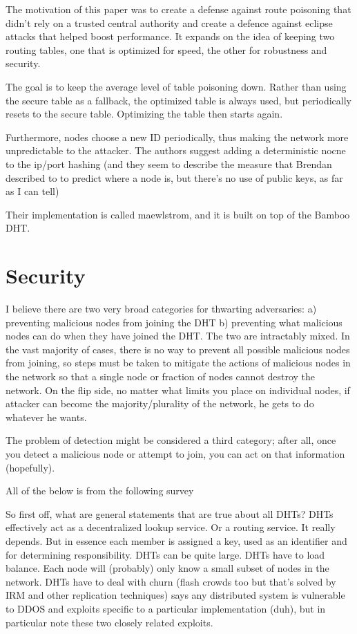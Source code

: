 \documentclass[10pt,letterpaper]{report}
\begin{document}
The motivation of this paper was to create a  defense against route poisoning that didn't rely on a trusted central authority and create a defence against eclipse attacks that helped boost performance.  It expands on the idea of keeping two routing tables, one that is optimized for speed, the other for robustness and security.

The goal is to keep the average level of table poisoning down.  Rather than using the secure table as a fallback, the optimized table is always used, but periodically resets to the secure table.  Optimizing the table then starts again.

Furthermore, nodes choose a new ID periodically, thus making the network more unpredictable to the attacker.   The authors suggest adding a deterministic nocne to the ip/port hashing (and they seem to describe the measure that Brendan described to to predict where a node is, but there's no use of public keys, as far as I can tell)

Their implementation is called maewlstrom, and it is built on top of the Bamboo DHT.


\section{Security}

I believe there are two very broad categories for thwarting adversaries:  a)  preventing malicious nodes from joining the DHT b) preventing what malicious nodes can do when they have joined the DHT.  The two are intractably mixed.  In the vast majority of cases, there is no way to prevent all possible malicious nodes from joining, so steps must be taken to mitigate the actions of malicious nodes in the network so that a single node or fraction of nodes cannot destroy the network.  On the flip side, no matter what limits you place on individual nodes, if attacker can become the majority/plurality of the network, he gets to do whatever he wants.

The problem of detection might be considered a third category;  after all, once you detect a malicious node or attempt to join, you can act on that information (hopefully).

All of the below is from the following survey \cite{dhtsec}


So first off, what are general statements that are true about all DHTs?
DHTs  effectively act as a decentralized lookup service.  Or a routing service.  It really depends.  But in essence each member is assigned a key, used as an identifier and for determining responsibility.
DHTs can be quite large.
DHTs have to load balance.
Each node will (probably) only know a small subset of nodes in the network.
DHTs have to deal with churn (flash crowds too but that's solved by IRM and other replication techniques)
\cite{dhtsec} says any distributed system is vulnerable to DDOS and exploits specific to a particular implementation (duh), but in particular note these two closely related exploits. 
\end{document}
